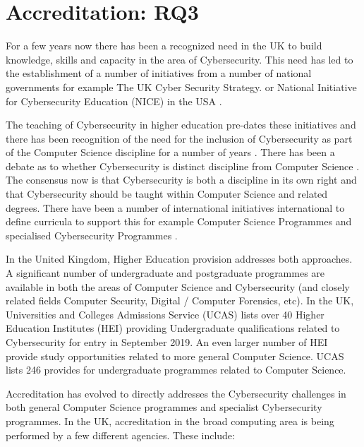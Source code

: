\documentclass[sigconf,anonymous]{acmart}
\begin{document}


\section{Accreditation: RQ3}

For a few years now there has been a recognized need in the UK to build knowledge, skills and capacity in the area of Cybersecurity. This need has led to the establishment of a number of initiatives from a number of national governments for example The UK Cyber Security Strategy. \cite{UKCabinetOffice} or National Initiative for Cybersecurity Education (NICE) in the USA \cite{NICE}. 

The teaching of Cybersecurity in higher education pre-dates these initiatives and there has been recognition of the need for the inclusion of Cybersecurity as part of the Computer Science discipline for a number of years \cite{Hentea2006}. There has  been a debate as to whether Cybersecurity is distinct discipline from Computer Science \cite{McGettreick2013}. The consensus now is that Cybersecurity is both a discipline in its own right and that Cybersecurity should be taught within Computer Science and related degrees. There have been a number of international initiatives international to define curricula to support this for example Computer Science Programmes  \cite[which added ``Information Assurance and Security'' for the first time]{ACM2013a} and specialised Cybersecurity Programmes \cite{ACMIEEEAISSIGSECIFIP}.

In the United Kingdom, Higher Education provision addresses both approaches. A significant number of undergraduate and postgraduate programmes are available in both the areas of Computer Science and Cybersecurity (and closely related fields Computer Security, Digital / Computer Forensics, etc). In the UK, Universities and Colleges Admissions Service (UCAS) lists over 40 Higher Education Institutes (HEI) providing Undergraduate qualifications related to Cybersecurity for entry in September 2019. An even larger number of HEI provide study opportunities related to more general Computer Science. UCAS lists 246 provides for undergraduate programmes related to Computer Science. 

Accreditation has evolved to directly addresses the Cybersecurity challenges in both general Computer Science programmes and specialist Cybersecurity programmes. In the UK, accreditation in the broad computing area is being performed by a few different agencies. These include:
\end{document}
